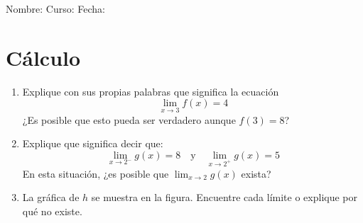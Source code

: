 \documentclass[letterpaper,fleqn]{article}
\newcommand{\LineaNombre}{%
\par
\vspace{\baselineskip}
Nombre:\hrulefill \; Curso: \underline{\hspace*{48pt}} \; Fecha: \underline{\hspace*{2.5cm}} \relax
\par}
\begin{document}
\LineaNombre
\section*{Cálculo}
\begin{enumerate}
 \item Explique con sus propias palabras que significa la ecuación \[\displaystyle{\lim_{x\rightarrow 3}f(x)=4}\] ¿Es posible que esto pueda ser verdadero aunque $f(3)=8$?\noanswer
 \item Explique que significa decir que:
 \[\displaystyle{\lim_{x\rightarrow 2^{-}}g(x)=8} \quad \text{y} \quad \displaystyle{\lim_{x\rightarrow 2^{+}}g(x)=5}\]
 En esta situaci\'{o}n, ¿es posible que $\displaystyle{\lim_{x\rightarrow 2}g(x)}$ exista?\noanswer
 \item La gr\'{a}fica de $h$ se muestra en la figura. Encuentre cada l\'{i}mite o explique por qu\'{e} no existe.
 

\end{enumerate}
\end{document}
